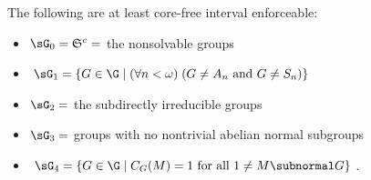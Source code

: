 \begin{frame}[label=IEPropsWithLemmaComment]{}
The following are at least core-free interval enforceable:
\vskip5mm
\begin{itemize}
\item $\sG_0 = \mathfrak{S}^c = $ the nonsolvable groups
\vskip2mm
\item $\sG_1 =\{G\in \G \mid (\forall n<\omega) \; (G \neq A_n \text{ and }  G\neq S_n) \}$
\vskip2mm
\item $\sG_2 = $ the subdirectly irreducible groups
\vskip2mm
\item $\sG_3 = $ groups with no nontrivial abelian normal subgroups
\vskip2mm
\item $\sG_4 = \{G\in \G \mid C_G(M) = 1 \text{ for all } 1\neq M\subnormal G\}$.
\end{itemize}
\vskip5mm
\end{frame}



